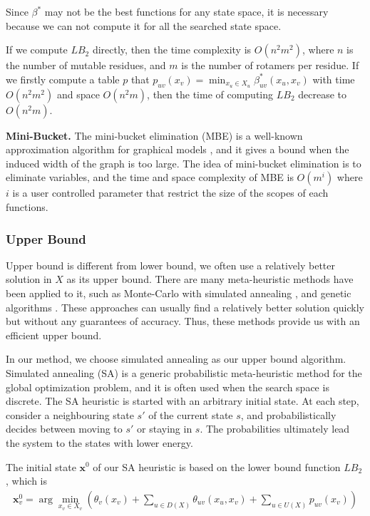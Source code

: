 Since $\beta^*$ may not be the best functions for any state space, it is necessary because we can not compute it for all the searched state space.

If we compute $LB_2$ directly, then the time complexity is $O(n^2m^2)$, where $n$ is the number of mutable residues, and $m$ is the number of rotamers per residue. If we firstly compute a table $p$ that $p_{uv}(x_v)=\min_{x_u\in X_u}\beta_{uv}^*(x_u,x_v)$ with time $O(n^2m^2)$ and space $O(n^2m)$, then the time of computing $LB_2$ decrease to $O(n^2m)$.

\noindent\textbf{Mini-Bucket.} The mini-bucket elimination (MBE) is a well-known approximation algorithm for graphical models \cite[]{dechter2003mini, rollon2010evaluating, rollon2006mini}, and it gives a bound when the induced width of the graph is too large. The idea of mini-bucket elimination is to eliminate variables, and the time and space complexity of MBE is $O(m^i)$ where $i$ is a user controlled parameter that restrict the size of the scopes of each functions.

\subsubsection{Upper Bound}
Upper bound is different from lower bound, we often use a relatively better solution in $X$ as its upper bound. There are many meta-heuristic methods have been applied to it, such as Monte-Carlo with simulated annealing \cite[]{kuhlman2000native, voigt2000trading}, and genetic algorithms \cite[]{raha2000prediction}. These approaches can usually find a relatively better solution quickly but without any guarantees of accuracy. Thus, these methods provide us with an efficient upper bound.

In our method, we choose simulated annealing as our upper bound algorithm. Simulated annealing (SA) is a generic probabilistic meta-heuristic method for the global optimization problem, and it is often used when the search space is discrete. The SA heuristic is started with an arbitrary initial state. At each step, consider a neighbouring state $s'$ of the current state $s$, and probabilistically decides between moving to $s'$ or staying in $s$. The probabilities ultimately lead the system to the states with lower energy.

The initial state $\mathbf{x}^0$ of our SA heuristic is based on the lower bound function $LB_2$, which is
\begin{align*}
\mathbf{x}_v^0\!=\!\arg\!\min_{x_v\in X_v}\left(\theta_v(x_v)\!+\!\sum_{u\in D(X)}\theta_{uv}(x_u,x_v)\!+\!\sum_{u\in U(X)}p_{uv}(x_v)\right)
\end{align*}

